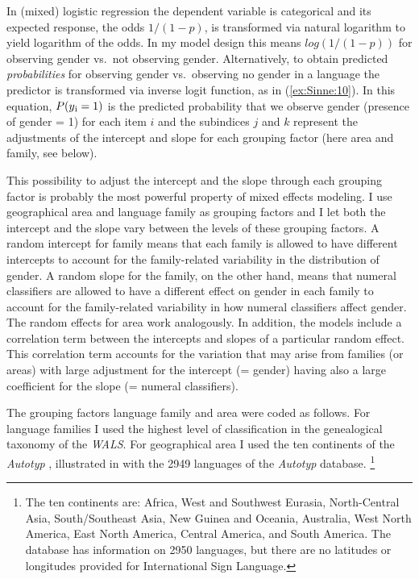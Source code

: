 \documentclass[output=collectionpaper]{langsci/langscibook}
\begin{document}
In (mixed) logistic regression the dependent variable is categorical and its expected response, the odds $1/(1-p)$, is transformed via natural logarithm to yield logarithm of the odds. In my model design this means $log(1/(1-p))$ for observing gender vs.\ not observing gender. Alternatively, to obtain predicted \textit{probabilities} for observing gender vs.\ observing no gender in a language the predictor is transformed via inverse logit function, as in (\ref{ex:Sinne:10}). In this equation, $P(y\textsubscript{i} = 1)$ is the predicted probability that we observe gender (presence of gender = 1) for each item $i$ and the subindices $j$ and $k$ represent the adjustments of the intercept and slope for each grouping factor (here area and family, see below).

This possibility to adjust the intercept and the slope through each grouping factor is probably the most powerful property of mixed effects modeling. I use geographical area and language family as grouping factors and I let both the intercept and the slope vary between the levels of these grouping factors. A random intercept for family means that each family is allowed to have different intercepts to account for the family-related variability in the distribution of gender. A random slope for the family, on the other hand, means that numeral classifiers are allowed to have a different effect on gender in each family to account for the family-related variability in how numeral classifiers affect gender. The random effects for area work analogously. In addition, the models include a correlation term between the intercepts and slopes of a particular random effect. This correlation term accounts for the variation that may arise from families (or areas) with large adjustment for the intercept (= gender) having also a large coefficient for the slope (= numeral classifiers).

The grouping factors language family and area were coded as follows. For language families I used the highest level of classification in the genealogical taxonomy of the \textit{WALS}. For geographical area I used the ten continents of the \textit{Autotyp} \citep{Bickel2017}, illustrated in  with the 2949 languages of the \textit{Autotyp} database.%
\footnote{The ten continents are: Africa, West and Southwest Eurasia, North-Central Asia, South/Southeast Asia, New Guinea and Oceania, Australia, West North America, East North America, Central America, and South America. The database has information on 2950 languages, but there are no latitudes or longitudes provided for International Sign Language.}
\end{document}
